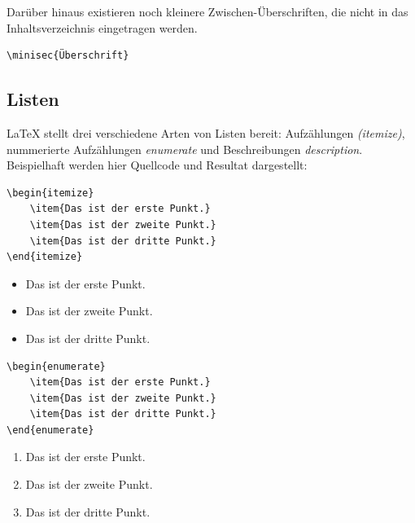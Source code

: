 Darüber hinaus existieren noch kleinere Zwischen-Überschriften, die nicht in das Inhaltsverzeichnis eingetragen werden.

\begin{verbatim}
\minisec{Überschrift}
\end{verbatim}



\subsection{Listen}

\LaTeX{} stellt drei verschiedene Arten von Listen bereit: Aufzählungen \emph{(itemize)}, nummerierte Aufzählungen \emph{enumerate} und Beschreibungen \emph{description}.
Beispielhaft werden hier Quellcode und Resultat dargestellt:


\begin{verbatim}
\begin{itemize}
    \item{Das ist der erste Punkt.}
    \item{Das ist der zweite Punkt.}
    \item{Das ist der dritte Punkt.}
\end{itemize}
\end{verbatim}

\begin{itemize}
    \item{Das ist der erste Punkt.}
    \item{Das ist der zweite Punkt.}
    \item{Das ist der dritte Punkt.}
\end{itemize}


\begin{verbatim}
\begin{enumerate}
    \item{Das ist der erste Punkt.}
    \item{Das ist der zweite Punkt.}
    \item{Das ist der dritte Punkt.}
\end{enumerate}
\end{verbatim}

\begin{enumerate}
    \item{Das ist der erste Punkt.}
    \item{Das ist der zweite Punkt.}
    \item{Das ist der dritte Punkt.}
\end{enumerate}

